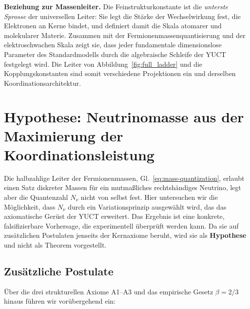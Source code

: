 \documentclass[12pt,a4paper]{article}
\begin{document}
	\textbf{Beziehung zur Massenleiter.}  Die Feinstrukturkonstante ist die
	\emph{unterste Sprosse} der universellen Leiter: Sie legt die Stärke der
	Wechselwirkung fest, die Elektronen an Kerne bindet, und definiert damit die Skala atomarer
	und molekularer Materie.  Zusammen mit der Fermionenmassenquantisierung und der
	elektroschwachen Skala zeigt sie, dass jeder fundamentale dimensionslose Parameter
	des Standardmodells durch die algebraische Schleife der YUCT festgelegt wird.  Die Leiter von
	Abbildung~\ref{fig:full_ladder} und die Kopplungskonstanten sind somit verschiedene
	Projektionen ein und derselben Koordinationsarchitektur.
	
	\section{Hypothese: Neutrinomasse aus der Maximierung der Koordinationsleistung}
	\label{sec:neutrino-hypothesis}
	
	Die halbzahlige Leiter der Fermionenmassen, Gl.~\eqref{eq:mass-quantization}, erlaubt einen Satz diskreter Massen für ein mutmaßliches rechtshändiges Neutrino, legt aber die Quantenzahl \(N_{\nu}\) nicht von selbst fest.  Hier untersuchen wir die Möglichkeit, dass \(N_{\nu}\) durch ein Variationsprinzip ausgewählt wird, das das axiomatische Gerüst der YUCT erweitert.  Das Ergebnis ist eine konkrete, falsifizierbare Vorhersage, die experimentell überprüft werden kann.  Da sie auf zusätzlichen Postulaten jenseits der Kernaxiome beruht, wird sie als \textbf{Hypothese} und nicht als Theorem vorgestellt.
	
	\subsection{Zusätzliche Postulate}
	
	Über die drei strukturellen Axiome A1--A3 und das empirische Gesetz \(\beta=2/3\) hinaus führen wir vorübergehend ein:
	
\end{document}
